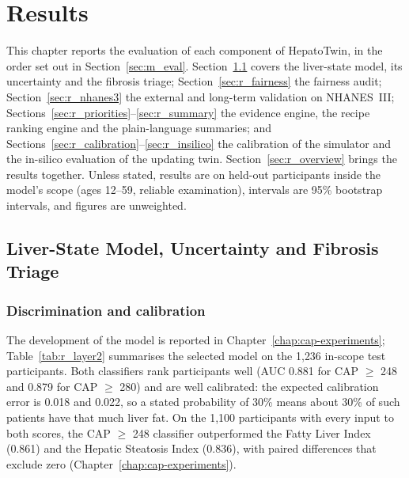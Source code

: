 \chapter{Results}
\label{chap:results}

This chapter reports the evaluation of each component of HepatoTwin, in the
order set out in Section~\ref{sec:m_eval}. Section~\ref{sec:r_layer2} covers
the liver-state model, its uncertainty and the fibrosis triage;
Section~\ref{sec:r_fairness} the fairness audit; Section~\ref{sec:r_nhanes3}
the external and long-term validation on NHANES~III;
Sections~\ref{sec:r_priorities}--\ref{sec:r_summary} the evidence engine, the
recipe ranking engine and the plain-language summaries; and
Sections~\ref{sec:r_calibration}--\ref{sec:r_insilico} the calibration of the
simulator and the in-silico evaluation of the updating twin.
Section~\ref{sec:r_overview} brings the results together. Unless stated,
results are on held-out participants inside the model's scope (ages 12--59,
reliable examination), intervals are 95\% bootstrap intervals, and figures are
unweighted.

\section{Liver-State Model, Uncertainty and Fibrosis Triage}
\label{sec:r_layer2}

\subsection{Discrimination and calibration}

The development of the model is reported in Chapter~\ref{chap:cap-experiments};
Table~\ref{tab:r_layer2} summarises the selected model on the 1{,}236 in-scope
test participants. Both classifiers rank participants well (AUC 0.881 for CAP
$\geq$ 248 and 0.879 for CAP $\geq$ 280) and are well calibrated: the expected
calibration error is 0.018 and 0.022, so a stated probability of 30\% means
about 30\% of such patients have that much liver fat. On the 1{,}100
participants with every input to both scores, the CAP $\geq$ 248 classifier
outperformed the Fatty Liver Index (0.861) and the Hepatic Steatosis Index
(0.836), with paired differences that exclude zero
(Chapter~\ref{chap:cap-experiments}).


